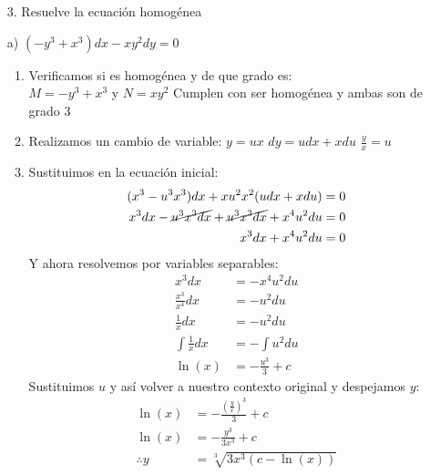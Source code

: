 \begin{enumerate}
    \item[3.] Resuelve la ecuación homogénea 
\end{enumerate}

\begin{itemize}
    \item[a)] $(-y^3+x^3)dx-xy^2dy=0$
    \begin{enumerate}
     \item Verificamos si es homogénea y de que grado es:\\
    $M=-y^3+x^3$ \hspace{.3cm} y  \hspace{.3cm}$N=xy^2$  \hspace{1cm} Cumplen con ser homogénea y ambas son de grado 3
    \item Realizamos un cambio de variable: $y=ux$\hspace{1cm} $dy=udx+xdu$\hspace{1cm} $\frac{y}{x}=u$
    \item Sustituimos en la ecuación inicial:
    \begin{align*}
        (x^3-u^3x^3)dx+xu^2x^2(udx+xdu) &= 0\\
        x^3dx-\cancel{u^3x^3dx}+\cancel{u^3x^3dx}+x^4u^2du &= 0\\
        x^3dx+x^4u^2du &= 0
    \end{align*}
    Y ahora resolvemos por variables separables:
    \begin{align*}
        x^3dx &= -x^4u^2du \\
        \frac{x^3}{x^4}dx &= -u^2du\\
        \frac{1}{x}dx  &= -u^2du\\
        \int\frac{1}{x}dx &= -\int u^2du \\
        \ln (x) &= -\frac{u^3}{3}+c
    \end{align*}
    Sustituimos $u$ y así volver a nuestro contexto original y despejamos $y$:
    \begin{align*}
        \ln (x) &= -\frac{\left(\frac{y}{x}\right) ^ 3}{3}+c \\
        \ln (x) &= -\frac{y^3}{3x^3}+c \\
        \therefore y &= \sqrt[3]{3x^3(c-\ln (x))}
    \end{align*}
    

\end{enumerate}
\end{itemize}
